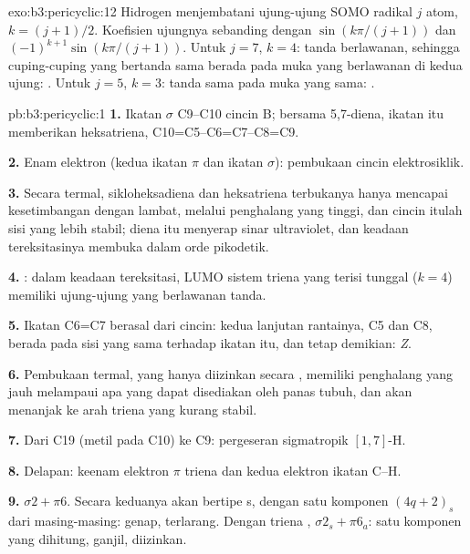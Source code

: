 \begin{solution}{exo:b3:pericyclic:12}
Hidrogen menjembatani ujung-ujung SOMO radikal $j$ atom, $k = (j + 1)/2$. Koefisien ujungnya
sebanding dengan $\sin(k\pi/(j + 1))$ dan $(-1)^{k+1}\sin(k\pi/(j + 1))$. Untuk $j = 7$, $k = 4$: tanda berlawanan, sehingga
cuping-cuping yang bertanda sama berada pada muka yang berlawanan di kedua ujung: . Untuk
$j = 5$, $k = 3$: tanda sama pada muka yang sama: .
\end{solution}

\begin{solution}{pb:b3:pericyclic:1}
\textbf{1.} Ikatan $\sigma$ C9--C10 cincin B; bersama 5,7-diena, ikatan itu memberikan heksatriena,
C10=C5--C6=C7--C8=C9.

\textbf{2.} Enam elektron (kedua ikatan $\pi$ dan ikatan $\sigma$): pembukaan cincin elektrosiklik.

\textbf{3.} Secara termal, sikloheksadiena dan heksatriena terbukanya hanya mencapai kesetimbangan
dengan lambat, melalui penghalang yang tinggi, dan cincin itulah sisi yang lebih stabil;
diena itu menyerap sinar ultraviolet, dan keadaan tereksitasinya membuka dalam
orde pikodetik.

\textbf{4.} : dalam keadaan tereksitasi, LUMO sistem triena yang terisi tunggal
($k = 4$) memiliki ujung-ujung yang berlawanan tanda.

\textbf{5.} Ikatan C6=C7 berasal dari cincin: kedua lanjutan rantainya, C5 dan C8,
berada pada sisi yang sama terhadap ikatan itu, dan tetap demikian: \textit{Z}.

\textbf{6.} Pembukaan termal, yang hanya diizinkan secara , memiliki penghalang yang jauh melampaui
apa yang dapat disediakan oleh panas tubuh, dan akan menanjak ke arah triena yang kurang stabil.

\textbf{7.} Dari C19 (metil pada C10) ke C9: pergeseran sigmatropik $[1,7]$-H.

\textbf{8.} Delapan: keenam elektron $\pi$ triena dan kedua elektron ikatan C--H.

\textbf{9.} $\sigma2 + \pi6$. Secara  keduanya akan bertipe s, dengan satu komponen $(4q + 2)_s$ dari masing-masing:
genap, terlarang. Dengan triena , $\sigma2_s + \pi6_a$: satu komponen yang dihitung, ganjil,
diizinkan.


\end{solution}
